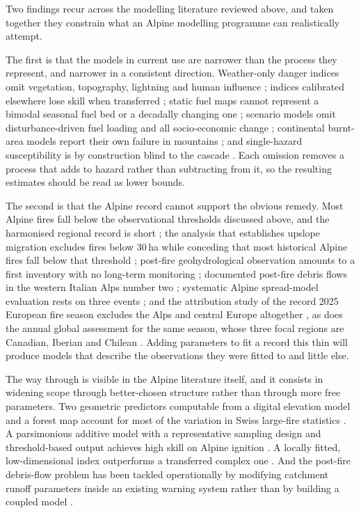 \documentclass[11pt,a4paper]{article}
\begin{document}
Two findings recur across the modelling literature reviewed above, and taken together they constrain what an Alpine modelling programme can realistically attempt.

The first is that the models in current use are narrower than the process they represent, and narrower in a consistent direction. Weather-only danger indices omit vegetation, topography, lightning and human influence \citep{muller_towards_2020}; indices calibrated elsewhere lose skill when transferred \citep{de_angelis_modelling_2015, gelabert_assessing_2025}; static fuel maps cannot represent a bimodal seasonal fuel bed or a decadally changing one \citep{bebi_changes_2017, frei_evidence_2023}; scenario models omit disturbance-driven fuel loading and all socio-economic change \citep{gerberding_mapping_2025}; continental burnt-area models report their own failure in mountains \citep{forrest_understanding_2024}; and single-hazard susceptibility is by construction blind to the cascade \citep{trucchia_defining_2022}. Each omission removes a process that adds to hazard rather than subtracting from it, so the resulting estimates should be read as lower bounds.

The second is that the Alpine record cannot support the obvious remedy. Most Alpine fires fall below the observational thresholds discussed above, and the harmonised regional record is short \citep{muller_forest_2020}; the analysis that establishes upslope migration excludes fires below 30\,ha while conceding that most historical Alpine fires fall below that threshold \citep{beloiu_climatedriven_2026}; post-fire geohydrological observation amounts to a first inventory with no long-term monitoring \citep{melzner_wildfire-induced_2025}; documented post-fire debris flows in the western Italian Alps number two \citep{tiranti_wildfires_2021}; systematic Alpine spread-model evaluation rests on three events \citep{malanchini_modeling_2025}; and the attribution study of the record 2025 European fire season excludes the Alps and central Europe altogether \citep{keeping_attribution_2026}, as does the annual global assessment for the same season, whose three focal regions are Canadian, Iberian and Chilean \citep{burton_state_2026}. Adding parameters to fit a record this thin will produce models that describe the observations they were fitted to and little else.

The way through is visible in the Alpine literature itself, and it consists in widening scope through better-chosen structure rather than through more free parameters. Two geometric predictors computable from a digital elevation model and a forest map account for most of the variation in Swiss large-fire statistics \citep{conedera_linking_2024}. A parsimonious additive model with a representative sampling design and threshold-based output achieves high skill on Alpine ignition \citep{moreno_1_nodate}. A locally fitted, low-dimensional index outperforms a transferred complex one \citep{de_angelis_modelling_2015}. And the post-fire debris-flow problem has been tackled operationally by modifying catchment runoff parameters inside an existing warning system rather than by building a coupled model \citep{tiranti_wildfires_2021}.
\end{document}
